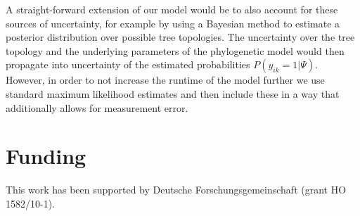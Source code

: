 \documentclass{bioinfo}
\begin{document}
A straight-forward extension of our model would be to also account for these sources of uncertainty, for example by using a Bayesian method to estimate a posterior distribution over possible tree topologies. The uncertainty over the tree topology and the underlying parameters of the phylogenetic model would then propagate into uncertainty of the estimated probabilities \(P(y_{ik}=1|\Psi)\). However, in order to not increase the runtime of the model further we use standard maximum likelihood estimates and then include these in a way that additionally allows for measurement error.

%
%











\section*{Funding}

This work has been supported by Deutsche Forschungsgemeinschaft (grant HO 1582/10-1).\vspace*{-12pt}


%
%
%
%
%
%
%

\end{document}
